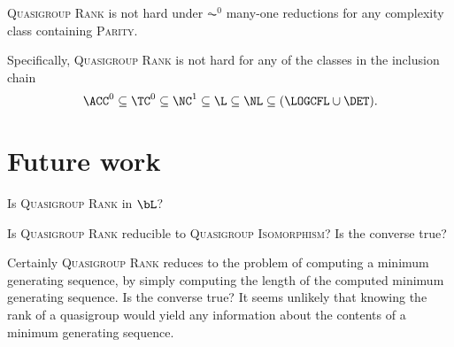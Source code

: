 \documentclass{article}
\begin{document}
\begin{theorem}
  \textsc{Quasigroup Rank} is not hard under $\AC^0$ many-one reductions for any complexity class containing \textsc{Parity}.
\end{theorem}

Specifically, \textsc{Quasigroup Rank} is not hard for any of the classes in the inclusion chain
$$
\ACC^0 \subseteq \TC^0 \subseteq \NC^1 \subseteq \L \subseteq \NL \subseteq (\LOGCFL \cup \DET).
$$

\section{Future work}

Is \textsc{Quasigroup Rank} in $\bL$?

Is \textsc{Quasigroup Rank} reducible to \textsc{Quasigroup Isomorphism}?
Is the converse true?

Certainly \textsc{Quasigroup Rank} reduces to the problem of computing a minimum generating sequence, by simply computing the length of the computed minimum generating sequence.
Is the converse true?
It seems unlikely that knowing the rank of a quasigroup would yield any information about the contents of a minimum generating sequence.

\printbibliography
\end{document}
